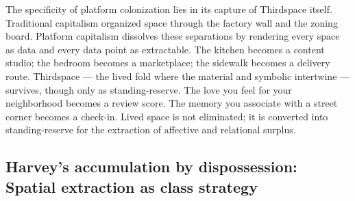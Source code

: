 The specificity of platform colonization lies in its capture of Thirdspace itself. Traditional capitalism organized space through the factory wall and the zoning board. Platform capitalism dissolves these separations by rendering every space as data and every data point as extractable. The kitchen becomes a content studio; the bedroom becomes a marketplace; the sidewalk becomes a delivery route. Thirdspace — the lived fold where the material and symbolic intertwine — survives, though only as standing-reserve. The love you feel for your neighborhood becomes a review score. The memory you associate with a street corner becomes a check-in. Lived space is not eliminated; it is converted into standing-reserve for the extraction of affective and relational surplus.

\subsection{Harvey's accumulation by dispossession: Spatial extraction as class strategy}

